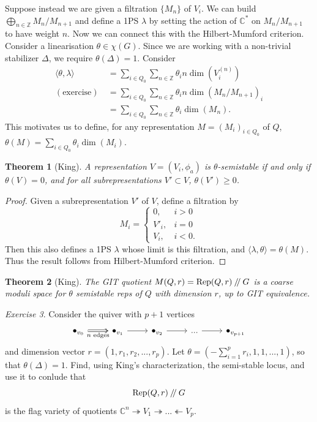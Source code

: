 \documentclass{article}
\newtheorem{theorem}{Theorem}
\theoremstyle{definition}
\theoremstyle{remark}
\newtheorem{exercise}[theorem]{Exercise}
\numberwithin{theorem}{section}
\newcommand{\C}{\mathbb{C}}
\newcommand{\sslash}{\mathbin{/\mkern-4mu/}}
\newcommand{\Rep}{\mathrm{Rep}}
\newenvironment{thm}{
\begin{mdframed}
	\vspace{-0.5em}
	\begin{theorem}
}{
	\end{theorem}
\end{mdframed}
}
\begin{document}
			Suppose instead we are given a filtration $\{M_n\}$ of $V_i$. We can build $\bigoplus_{n\in \mathbb{Z}}M_n/M_{n+1}$ and define a 1PS $\lambda$ by setting the action of $\C^\ast$ on $M_n/M_{n+1}$ to have weight $n$. Now we can connect this with the Hilbert-Mumford criterion. Consider a linearisation $\theta \in \chi(G)$. Since we are working with a non-trivial stabilizer $\Delta$, we require $\theta(\Delta)=1$. Consider 
			\begin{align*}
				\langle \theta, \lambda \rangle &= \sum_{i\in Q_0}\sum_{n\in\mathbb{Z}} \theta_i n \dim(V_i^{(n)})\\
				(\text{exercise}) ~ &= \sum_{i\in Q_0}\sum_{n\in\mathbb{Z}} \theta_i n \dim\left(M_n/M_{n+1}\right)_i\\
				&= \sum_{i\in Q_0} \sum_{n\in\mathbb{Z}} \theta_i \dim(M_n).
			\end{align*}
			This motivates us to define, for any representation $M=(M_i)_{i\in Q_0}$ of $Q$, $\theta(M) = \sum_{i\in Q_0} \theta_i \dim (M_i)$.
			\begin{thm}[King]
				A representation $V=(V_i,\phi_a)$ is $\theta$-semistable if and only if $\theta(V)=0$, and for all subrepresentations $V'\subset V$, $\theta(V') \geq 0$.
			\end{thm}
			\begin{proof}
				Given a subrepresentation $V'$ of $V$, define a filtration by
				$$M_i = \begin{cases}
				0, & i>0\\
				V'_i, & i=0\\
				V_i, & i< 0.
				\end{cases}$$
				Then this also defines a 1PS $\lambda$ whose limit is this filtration, and $\langle \lambda, \theta \rangle = \theta(M)$. Thus the result follows from Hilbert-Mumford criterion.
			\end{proof}
			\begin{thm}[King]
				The GIT quotient $M(Q,r) = \Rep(Q,r)\sslash G$ is a coarse moduli space for $\theta$ semistable reps of $Q$ with dimension $r$, up to GIT equivalence.
			\end{thm}
			\begin{exercise}
				Consider the quiver with $p+1$ vertices
				\[\begin{tikzcd}
					\bullet_{v_0} & \bullet_{v_1} & \bullet_{v_2} & {...} & \bullet_{v_{p+1}}
					\arrow[from=1-1, to=1-2]
					\arrow[from=1-2, to=1-3]
					\arrow[from=1-3, to=1-4]
					\arrow[from=1-4, to=1-5]
					\arrow["{n \text{ edges}}"', Rightarrow, from=1-1, to=1-2]
				\end{tikzcd}\]
				and dimension vector $r=(1,r_1,r_2,...,r_p)$. Let $\theta = \left(-\sum_{i=1}^p r_i, 1, 1,...,1\right)$, so that $\theta(\Delta)=1$. Find, using King's characterization, the semi-stable locus, and use it to conlude that
				$$\Rep(Q,r)\sslash G$$
				is the flag variety of quotients $\C^n \twoheadrightarrow V_1 \twoheadrightarrow ... \twoheadleftarrow V_p$. 
			\end{exercise}
\end{document}
